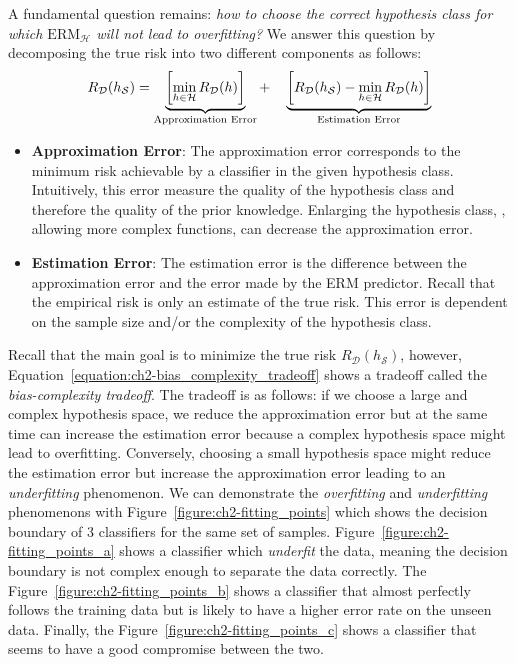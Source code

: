 A fundamental question remains: \emph{how to choose the correct hypothesis class for which $\text{ERM}_\mathcal{H}$ will not lead to overfitting?} 
We answer this question by decomposing the true risk into two different components as follows: 
\begin{equation}
  R_\mathcal{D} (h_\mathcal{S}) = 
  \underbrace{\left[ \min_{h \in \mathcal{H}} R_\mathcal{D}(h) \right]}_{\text{\scriptsize Approximation Error}} + \quad 
  \underbrace{\left[ R_\mathcal{D}(h_\mathcal{S}) - \min_{h \in \mathcal{H}} R_\mathcal{D}(h) \right]}_{\text{\scriptsize Estimation Error}} 
  \label{equation:ch2-bias_complexity_tradeoff}
\end{equation}
\begin{itemize}
  \item \textbf{Approximation Error}: The approximation error corresponds to the minimum risk achievable by a classifier in the given hypothesis class.
  Intuitively, this error measure the quality of the hypothesis class and therefore the quality of the prior knowledge.
  Enlarging the hypothesis class, \ie, allowing more complex functions, can decrease the approximation error.
  \item \textbf{Estimation Error}: The estimation error is the difference between the approximation error and the error made by the ERM predictor.
  Recall that the empirical risk is only an estimate of the true risk.
  This error is dependent on the sample size and/or the complexity of the hypothesis class. 
\end{itemize}
Recall that the main goal is to minimize the true risk $R_\mathcal{D} (h_\mathcal{S})$, however, Equation~\ref{equation:ch2-bias_complexity_tradeoff} shows a tradeoff called the \emph{bias-complexity tradeoff}. 
The tradeoff is as follows: if we choose a large and complex hypothesis space, we reduce the approximation error but at the same time can increase the estimation error because a complex hypothesis space might lead to overfitting.
Conversely, choosing a small hypothesis space might reduce the estimation error but increase the approximation error leading to an \emph{underfitting} phenomenon.
We can demonstrate the \emph{overfitting} and \emph{underfitting} phenomenons with Figure~\ref{figure:ch2-fitting_points} which shows the decision boundary of 3 classifiers for the same set of samples.
Figure~\ref{figure:ch2-fitting_points_a} shows a classifier which \emph{underfit} the data, meaning the decision boundary is not complex enough to separate the data correctly. 
The Figure~\ref{figure:ch2-fitting_points_b} shows a classifier that almost perfectly follows the training data but is likely to have a higher error rate on the unseen data.
Finally, the Figure~\ref{figure:ch2-fitting_points_c} shows a classifier that seems to have a good compromise between the two.

